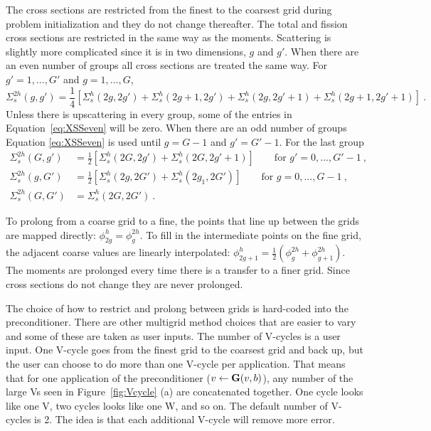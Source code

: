 The cross sections are restricted from the finest to the coarsest grid during problem initialization and they do not change thereafter. The total and fission cross sections are restricted in the same way as the moments. Scattering is slightly more complicated since it is in two dimensions, $g$ and $g'$. When there are an even number of groups all cross sections are treated the same way. For $g' = 1,..., G'$ and $g = 1, ..., G$,
\begin{equation}
  \Sigma_s^{2h}(g,g') = \frac{1}{4}[\Sigma_s^{h}(2g,2g') + \Sigma_s^{h}(2g+1,2g') + \Sigma_s^{h}(2g,2g'+1) + \Sigma_s^{h}(2g+1,2g'+1)] \:. 
  \label{eq:XSSeven}
\end{equation}
% 
Unless there is upscattering in every group, some of the entries in Equation~\eqref{eq:XSSeven} will be zero. When there are an odd number of groups Equation \eqref{eq:XSSeven} is used until $g=G-1$ and $g'=G'-1$. For the last group
  \begin{align}
    \Sigma^{2h}_s(G,g') &= \frac{1}{2}[\Sigma^{h}_s(2G,2g') + \Sigma^{h}_s(2G,2g'+1)] \qquad \text{for } g' = 0,...,G'-1 \:,\nonumber \\
    \Sigma^{2h}_s(g,G') &=  \frac{1}{2}[\Sigma^{h}_s(2g,2G') + \Sigma^{h}_s(2g_1,2G')] \qquad \text{for } g  = 0,...,G-1 \:,\nonumber \\
    \Sigma^{2h}_s(G,G') &= \Sigma^{h}_s(2G,2G') \nonumber \:.
  \end{align}

To prolong from a coarse grid to a fine, the points that line up between the grids are mapped directly: $\phi_{2g}^{h} = \phi_{g}^{2h}$. To fill in the intermediate points on the fine grid, the adjacent coarse values are linearly interpolated: $\phi_{2g+1}^{h} = \frac{1}{2}(\phi_{g}^{2h} + \phi_{g+1}^{2h})$. The moments are prolonged every time there is a transfer to a finer grid. Since cross sections do not change they are never prolonged. 

The choice of how to restrict and prolong between grids is hard-coded into the preconditioner. There are other multigrid method choices that are easier to vary and some of these are taken as user inputs. The number of V-cycles is a user input. One V-cycle goes from the finest grid to the coarsest grid and back up, but the user can choose to do more than one V-cycle per application. That means that for one application of the preconditioner ($v \leftarrow \mathbf{G}(v,b)$), any number of the large Vs seen in Figure~\ref{fig:Vcycle} (a) are concatenated together. One cycle looks like one V, two cycles looks like one W, and so on. The default number of V-cycles is 2. The idea is that each additional V-cycle will remove more error. 

